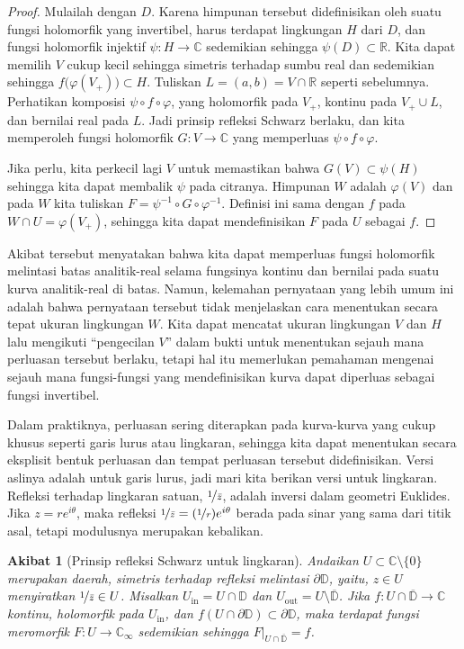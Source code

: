 \documentclass[12pt,openany]{book}
\newcommand{\C}{{\mathbb{C}}}
\newcommand{\R}{{\mathbb{R}}}
\newcommand{\D}{{\mathbb{D}}}
\newcommand{\myquote}[1]{``#1''}
\theoremstyle{plain}
\newtheorem{cor}[thm]{Akibat}
\theoremstyle{remark}
\theoremstyle{definition}
\theoremstyle{exercise}
\theoremstyle{example}
\begin{document}
\begin{proof}
Mulailah dengan $D$.  Karena himpunan tersebut didefinisikan oleh suatu fungsi holomorfik
yang invertibel,
harus terdapat lingkungan $H$ dari $D$, dan fungsi holomorfik injektif
$\psi \colon H \to \C$ sedemikian sehingga $\psi(D) \subset \R$.
Kita dapat memilih $V$ cukup kecil sehingga simetris terhadap sumbu real
dan sedemikian sehingga $f\bigl(\varphi(V_+)\bigr) \subset H$.
Tuliskan $L = (a,b) = V \cap \R$ seperti sebelumnya.
Perhatikan komposisi $\psi \circ f \circ \varphi$, yang
holomorfik pada $V_+$, kontinu pada $V_+ \cup L$, dan
bernilai real pada $L$.  Jadi prinsip refleksi Schwarz berlaku,
dan kita memperoleh fungsi holomorfik $G \colon V \to \C$ yang memperluas
$\psi \circ f \circ \varphi$.

Jika perlu, kita perkecil lagi $V$ untuk memastikan bahwa $G(V) \subset \psi(H)$ sehingga
kita dapat membalik $\psi$ pada citranya.
Himpunan $W$ adalah $\varphi(V)$ dan pada $W$
kita tuliskan $F = \psi^{-1} \circ G \circ \varphi^{-1}$.  Definisi ini
sama dengan $f$ pada $W \cap U = \varphi(V_+)$, sehingga kita dapat mendefinisikan $F$ pada $U$ sebagai $f$.
\end{proof}

Akibat tersebut menyatakan bahwa kita dapat memperluas fungsi holomorfik melintasi
batas analitik-real selama fungsinya kontinu dan bernilai pada
suatu kurva analitik-real di batas.  Namun, kelemahan pernyataan yang lebih
umum ini adalah bahwa pernyataan tersebut
tidak menjelaskan cara menentukan secara tepat ukuran lingkungan $W$.
Kita dapat mencatat ukuran lingkungan $V$ dan $H$
lalu mengikuti \myquote{pengecilan $V$} dalam bukti untuk menentukan sejauh mana
perluasan tersebut berlaku, tetapi hal itu memerlukan pemahaman mengenai sejauh mana
fungsi-fungsi yang mendefinisikan kurva dapat diperluas sebagai fungsi invertibel.

Dalam praktiknya, perluasan sering diterapkan pada kurva-kurva yang cukup khusus seperti
garis lurus atau lingkaran, sehingga kita dapat
menentukan secara eksplisit bentuk perluasan dan tempat perluasan tersebut didefinisikan.
Versi aslinya adalah untuk
garis lurus, jadi mari kita berikan versi untuk lingkaran.
Refleksi terhadap lingkaran satuan, $\nicefrac{1}{\bar{z}}$, adalah inversi dalam
geometri Euklides.
Jika $z = re^{i\theta}$, maka refleksi
$\nicefrac{1}{\bar{z}} = (\nicefrac{1}{r}) e^{i\theta}$ berada pada sinar yang sama dari
titik asal, tetapi modulusnya merupakan kebalikan.

\begin{cor}[Prinsip refleksi Schwarz untuk lingkaran]
\label{thm:schwarzreflectioncircleholo}
Andaikan $U \subset \C \setminus \{ 0 \}$ merupakan daerah,
simetris terhadap refleksi melintasi $\partial \D$,
yaitu, $z \in U$ menyiratkan $\nicefrac{1}{\bar{z}} \in U$.
Misalkan $U_{\text{in}} = U \cap \D$ dan $U_{\text{out}} = U \setminus \overline{\D}$.
Jika $f \colon U \cap \overline{\D} \to \C$ kontinu,
holomorfik pada $U_{\text{in}}$,
dan $f(U \cap \partial \D) \subset \partial \D$,
maka terdapat fungsi meromorfik $F \colon U \to \C_\infty$ sedemikian sehingga
$F|_{U \cap \overline{\D}} = f$.
\end{cor}
\end{document}
